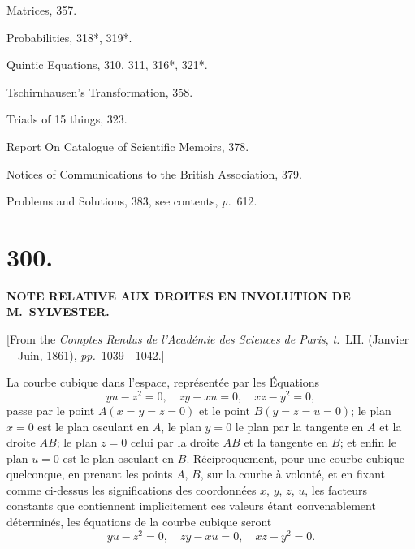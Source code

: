 \documentclass[11pt,a4paper]{article}
\newcommand{\tome}{\textit{t.}}
\newcommand{\page}{\textit{p.}}
\newcommand{\pages}{\textit{pp.}}
\begin{document}
Matrices, 357.

Probabilities, 318*, 319*.

Quintic Equations, 310, 311, 316*, 321*.

Tschirnhausen's Transformation, 358.

Triads of 15 things, 323.

Report On Catalogue of Scientific Memoirs, 378.

Notices of Communications to the British Association, 379.

Problems and Solutions, 383, see contents, \page~612.

\clearpage
\thispagestyle{empty}
\mbox{}
\clearpage


\setcounter{page}{1}

\section*{300.}

\begin{center}
\textbf{NOTE RELATIVE AUX DROITES EN INVOLUTION DE M.~SYLVESTER.}
\end{center}

[From the \textit{Comptes Rendus de l'Acad\'{e}mie des Sciences de Paris}, \tome~LII. (Janvier---Juin, 1861), \pages~1039---1042.]

\medskip

La courbe cubique dans l'espace, repr\'{e}sent\'{e}e par les \'{E}quations
\[
yu - z^2 = 0, \quad zy - xu = 0, \quad xz - y^2 = 0,
\]
passe par le point $A(x = y = z = 0)$ et le point $B(y = z = u = 0)$; le plan $x = 0$ est le plan osculant en $A$, le plan $y = 0$ le plan par la tangente en $A$ et la droite $AB$; le plan $z = 0$ celui par la droite $AB$ et la tangente en $B$; et enfin le plan $u = 0$ est le plan osculant en $B$. R\'{e}ciproquement, pour une courbe cubique quelconque, en prenant les points $A$, $B$, sur la courbe \`{a} volont\'{e}, et en fixant comme ci-dessus les significations des coordonn\'{e}es $x$, $y$, $z$, $u$, les facteurs constants que contiennent implicitement ces valeurs \'{e}tant convenablement d\'{e}termin\'{e}s, les \'{e}quations de la courbe cubique seront
\[
yu - z^2 = 0, \quad zy - xu = 0, \quad xz - y^2 = 0.
\]
\end{document}

